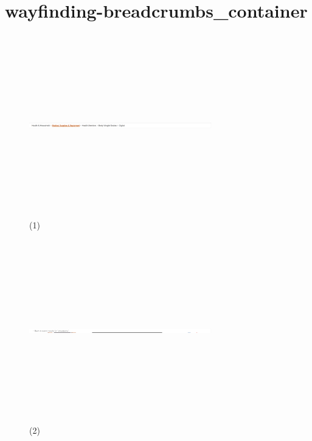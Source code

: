 \documentclass[12pt]{article}
\begin{document}
\section*{wayfinding-breadcrumbs\_container}
\begin{figure}[htp]
\centering
\includegraphics[width=300px,height=300px]{images/wayfinding-breadcrumbs_container(1).png}
\caption{(1)}
\end{figure}

\pagebreak

\begin{figure}[htp]
\centering
\includegraphics[width=300px,height=300px]{images/wayfinding-breadcrumbs_container(2).png}
\caption{(2)}
\end{figure}
\end{document}
